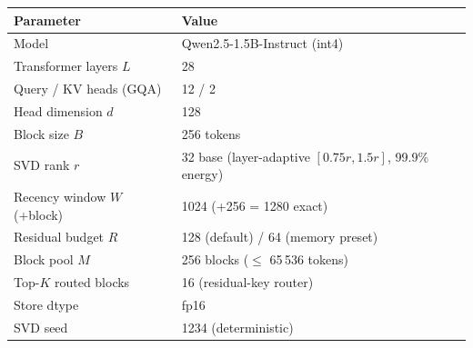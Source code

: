 \begin{tabular}{ll}
\toprule
Parameter & Value \\
\midrule
Model & Qwen2.5-1.5B-Instruct (int4) \\
Transformer layers $L$ & 28 \\
Query / KV heads (GQA) & 12 / 2 \\
Head dimension $d$ & 128 \\
Block size $B$ & 256 tokens \\
SVD rank $r$ & 32 base (layer-adaptive $[0.75r, 1.5r]$, 99.9\% energy) \\
Recency window $W$ (+block) & 1024 (+256 = 1280 exact) \\
Residual budget $R$ & 128 (default) / 64 (memory preset) \\
Block pool $M$ & 256 blocks ($\le$ 65\,536 tokens) \\
Top-$K$ routed blocks & 16 (residual-key router) \\
Store dtype & fp16 \\
SVD seed & 1234 (deterministic) \\
\bottomrule
\end{tabular}
